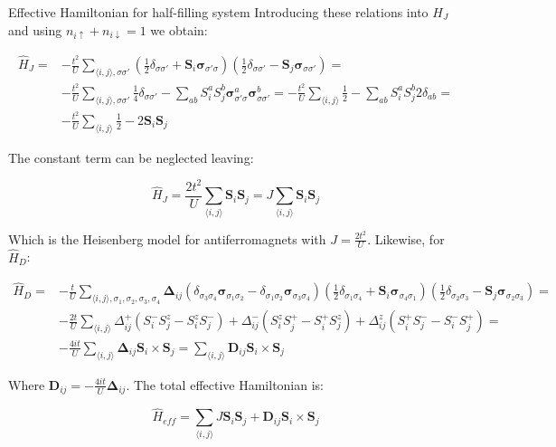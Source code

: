 \begin{section}{Effective Hamiltonian for half-filling system}
Introducing these relations into $H_J$ and using $n_{i \uparrow} + n_{i \downarrow} = 1$ we obtain:

\begin{align*}
\hat{H}_{J} = &-\frac{t^2}{U} \sum_{\langle i,j \rangle, \sigma \sigma'} \left(\frac{1}{2}\delta_{\sigma \sigma'} + \boldsymbol{S}_i\boldsymbol{\sigma}_{\sigma' \sigma}\right)\left(\frac{1}{2}\delta_{\sigma \sigma'}-\boldsymbol{S}_j\boldsymbol{\sigma}_{\sigma \sigma'}\right) = \\
&-\frac{t^2}{U}\sum_{\langle i,j \rangle, \sigma \sigma'} \frac{1}{4}\delta_{\sigma \sigma'} - \sum_{ab} S_i^aS_j^b 	\boldsymbol{\sigma}_{\sigma'\sigma}^a \boldsymbol{\sigma}_{\sigma \sigma'}^b = 
-\frac{t^2}{U}\sum_{\langle i,j \rangle} \frac{1}{2} - \sum_{ab} S_i^aS_j^b	2\delta_{ab} = \\
&-\frac{t^2}{U}\sum_{\langle i,j \rangle} \frac{1}{2} - 2\boldsymbol{S}_i\boldsymbol{S}_j
\end{align*}

The constant term can be neglected leaving:

\begin{equation}
\hat{H}_{J} = \frac{2t^2}{U} \sum_{\langle i,j \rangle} \boldsymbol{S}_i\boldsymbol{S}_j = J\sum_{\langle i,j \rangle} \boldsymbol{S}_i\boldsymbol{S}_j
\end{equation}

Which is the Heisenberg model for antiferromagnets with $J = \frac{2t^2}{U}$. Likewise, for $\hat{H}_D$:

\begin{align*}
\hat{H}_D = &-\frac{t}{U} \sum_{\langle i,j \rangle, \sigma_1, \sigma_2, \sigma_3, \sigma_4}\boldsymbol{\Delta}_{ij}(\delta_{\sigma_3 \sigma_4}\boldsymbol{\sigma}_{\sigma_1 \sigma_2} - \delta_{\sigma_1 \sigma_2} \boldsymbol{\sigma}_{\sigma_3\sigma_4})\left(\frac{1}{2}\delta_{\sigma_1 \sigma_4} + \boldsymbol{S}_i\boldsymbol{\sigma}_{\sigma_4 \sigma_1}\right)\left(\frac{1}{2}\delta_{\sigma_2 \sigma_3}-\boldsymbol{S}_j\boldsymbol{\sigma}_{\sigma_2 \sigma_3}\right) = \\
&-\frac{2t}{U}\sum_{\langle i,j \rangle} \Delta_{ij}^+ (S_i^-S_j^z - S_i^zS_j^-) + \Delta_{ij}^- (S_i^zS_j^+ - S_i^+S_j^z) + \Delta_{ij}^z (S_i^+S_j^- - S_i^-S_j^+) = \\
&-\frac{4it}{U} \sum_{\langle i,j \rangle} \boldsymbol{\Delta}_{ij} \boldsymbol{S}_i \times \boldsymbol{S}_j = \sum_{\langle i,j \rangle} \boldsymbol{D}_{ij} \boldsymbol{S}_i \times \boldsymbol{S}_j
\end{align*}

Where $\boldsymbol{D}_{ij} = -\frac{4it}{U}\boldsymbol{\Delta}_{ij}$. The total effective Hamiltonian is:

\begin{equation}
\hat{H}_{eff} = \sum_{\langle i,j \rangle} J\boldsymbol{S}_i\boldsymbol{S}_j + \boldsymbol{D}_{ij} \boldsymbol{S}_i \times \boldsymbol{S}_j
\end{equation}

\end{section}


